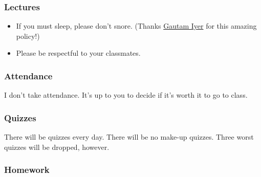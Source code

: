 \documentclass[
]{article}
\providecommand{\tightlist}{%
  \setlength{\itemsep}{0pt}\setlength{\parskip}{0pt}}
\begin{document}
\subsubsection*{Lectures}\label{lectures}

\begin{itemize}
\tightlist
\item
  If you must sleep, please don't snore. (Thanks \href{https://www.math.cmu.edu/~gautam/}{Gautam Iyer} for this amazing policy!)
\item
  Please be respectful to your classmates.
\end{itemize}

\subsubsection*{Attendance}\label{attendance}

I don't take attendance. It's up to you to decide if it's worth it to go to
class.

\subsubsection*{Quizzes}\label{quizzes}

There will be quizzes every day.
There will be no make-up quizzes.
Three worst quizzes will be dropped, however.

\subsubsection*{Homework}\label{homework}
\end{document}
